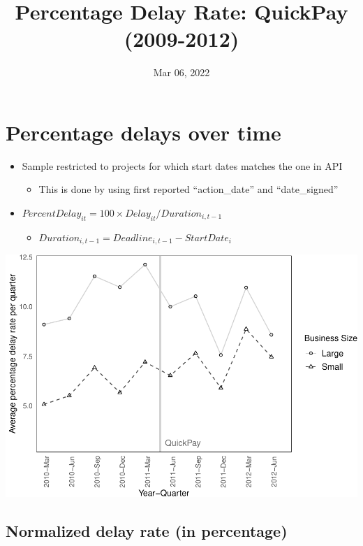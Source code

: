 \documentclass[
]{article}
\title{Percentage Delay Rate: QuickPay (2009-2012)}
\author{}
\date{\vspace{-2.5em}Mar 06, 2022}
\providecommand{\tightlist}{%
  \setlength{\itemsep}{0pt}\setlength{\parskip}{0pt}}
\begin{document}
\maketitle

\hypertarget{percentage-delays-over-time}{%
\section{Percentage delays over
time}\label{percentage-delays-over-time}}

\begin{itemize}
\tightlist
\item
  Sample restricted to projects for which start dates matches the one in
  API

  \begin{itemize}
  \tightlist
  \item
    This is done by using first reported ``action\_date'' and
    ``date\_signed''
  \end{itemize}
\item
  \(PercentDelay_{it}=100 \times Delay_{it}/Duration_{i,t-1}\)

  \begin{itemize}
  \tightlist
  \item
    \(Duration_{i,t-1} = Deadline_{i,t-1} - StartDate_i\)
  \end{itemize}
\end{itemize}

\includegraphics{qp_first_pc_delay-2_files/figure-latex/plot_pc_delay-1.pdf}

\hypertarget{normalized-delay-rate-in-percentage}{%
\subsection{Normalized delay rate (in
percentage)}\label{normalized-delay-rate-in-percentage}}
\end{document}
